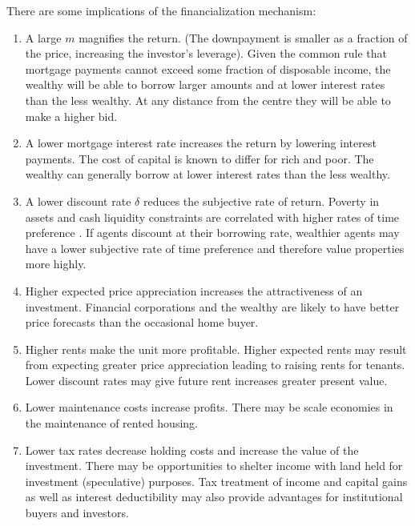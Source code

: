There are some implications of the financialization mechanism:
\begin{enumerate}
\item A large $m$ magnifies the return. (The downpayment is smaller as a fraction of the price, increasing the investor's leverage). 
Given the  common rule that mortgage payments cannot exceed some fraction of disposable income, the wealthy will be able to borrow larger amounts and at lower interest rates than the less wealthy. At any distance from the centre they will be able to make a higher bid.

\item A lower mortgage interest rate increases the return by lowering interest payments. The cost of capital is known to differ for rich and poor.  The wealthy can generally borrow  at lower interest rates than the less wealthy. 

\item A lower discount rate $\delta$ reduces the subjective rate of return.  Poverty in assets and cash liquidity constraints are correlated with higher rates of time preference  \cite{carvalhoPovertyTimePreference2010}\cite{holdenPovertyMarketImperfections1998}. If agents discount at their borrowing rate, wealthier agents may have a lower subjective rate of time preference and therefore value properties more highly. 

\item Higher expected price appreciation increases the attractiveness of an investment. Financial corporations and the wealthy are likely to have better price forecasts than  the occasional home buyer.

\item Higher rents make the unit more profitable. Higher expected  rents may result from expecting greater price appreciation  leading to raising rents for tenants. Lower discount rates may give future rent increases greater present value.

\item Lower maintenance costs increase profits. There may be scale economies in the maintenance  of rented housing. 

\item Lower tax rates decrease holding costs and increase the value of the investment. There may be opportunities to shelter income with land held for investment (speculative) purposes. Tax treatment of income and capital gains as well as interest deductibility may also provide advantages for institutional buyers and investors.%
\end{enumerate}

